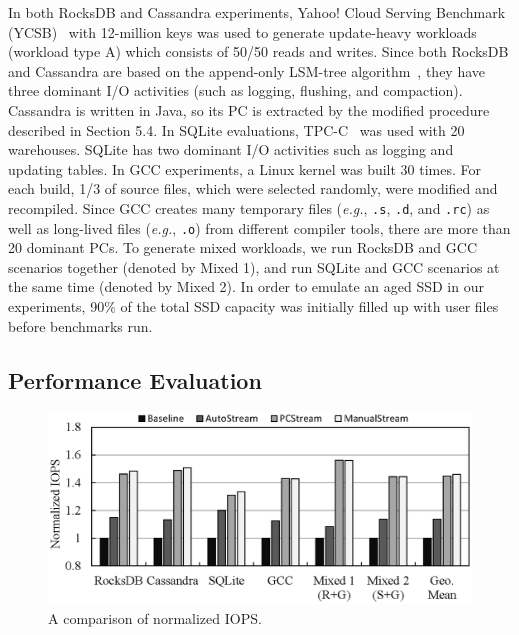 In both RocksDB and Cassandra experiments, Yahoo! Cloud Serving Benchmark
(YCSB)~\cite{YCSB} with 12-million keys was used to generate update-heavy
workloads (workload type A) which consists of 50/50 reads and writes.  Since
both RocksDB and Cassandra are based on the append-only LSM-tree
algorithm~\cite{LSM}, they have three dominant I/O activities (such as logging,
flushing, and compaction).  Cassandra is written in Java, so its PC is
extracted by the modified procedure described in Section 5.4.  In SQLite evaluations,
TPC-C~\cite{TPCC} was used with 20 warehouses.  SQLite has two dominant I/O
activities such as logging and updating tables.  In GCC experiments, a Linux
kernel was built 30 times.  For each build, 1/3 of source files, which were
selected randomly, were modified and recompiled.  Since GCC creates many
temporary files ({\it e.g.}, \texttt{.s}, \texttt{.d}, and \texttt{.rc}) as
well as long-lived files ({\it e.g.}, \texttt{.o}) from different compiler
tools, there are more than 20 dominant PCs.  To generate mixed workloads, we run
RocksDB and GCC scenarios together (denoted by Mixed 1), and run SQLite and GCC
scenarios at the same time (denoted by Mixed 2).  In order to emulate an aged
SSD in our experiments, 90\% of the total SSD capacity was initially filled up
with user files before benchmarks run.

\vspace{-10pt}
\subsection{Performance Evaluation}
\vspace{-5pt}

\begin{figure}[t]
	\centering
	\includegraphics[width=0.95\linewidth]{figure/iops}
	\caption{A comparison of normalized IOPS.}
	\vspace{-5pt}
	\label{fig:iops}
	\vspace{-10pt}
\end{figure}

